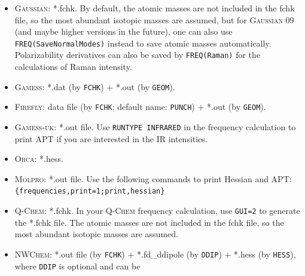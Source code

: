 \documentclass[12pt,english]{extarticle}
\begin{document}

\begin{itemize}
\item \textsc{Gaussian}: *.fchk. By default, the atomic masses are not included in the fchk file, so the most abundant isotopic masses are assumed, but for \textsc{Gaussian} 09 (and maybe higher versions in the future), one can also use \texttt{FREQ(SaveNormalModes)} instead to save atomic masses automatically. Polarizability derivatives can also be saved by \texttt{FREQ(Raman)} for the calculations of Raman intensity.
\item \textsc{Gamess}: *.dat (by \verb|FCHK|) + *.out (by \verb|GEOM|).
\item \textsc{Firefly}: data file (by \verb|FCHK|; default name: \verb|PUNCH|) + *.out (by \verb|GEOM|).
\item \textsc{Gamess-uk}: *.out file. Use \texttt{RUNTYPE INFRARED} in the frequency calculation to
print APT if you are interested in the IR intensities.
\item \textsc{Orca}: *.hess.
\item \textsc{Molpro}: *.out file. Use the following commands to print Hessian and APT: \\
\verb|{frequencies,print=1;print,hessian}|
\item \textsc{Q-Chem}: *.fchk. In your \textsc{Q-Chem} frequency calculation, use \texttt{GUI=2} to
generate the *.fchk file. The atomic masses are not included in the fchk
file, so the most abundant isotopic masses are assumed.
\item \textsc{NWChem}: *.out file (by \verb|FCHK|) + *.fd{\_}ddipole (by \verb|DDIP|) +
*.hess (by \verb|HESS|), where \verb|DDIP| is optional and can be

\end{itemize}
\end{document}
